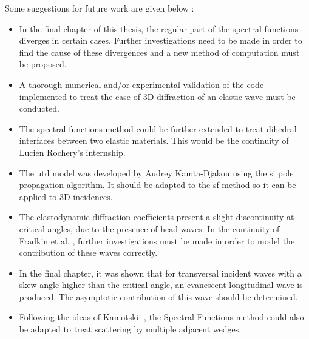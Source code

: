 Some suggestions for future work are given below :
\begin{itemize}
\item In the final chapter of this thesis, the regular part of the spectral functions diverges in certain cases. Further investigations need to be made in order to find the cause of these divergences and a new method of computation must be proposed.
\item A thorough numerical and/or experimental validation of the code implemented to treat the case of 3D diffraction of an elastic wave must be conducted.
\item The spectral functions method could be further extended to treat dihedral interfaces between two elastic materials. This would be the continuity of Lucien Rochery's internship.
\item The \acrshort{utd} model was developed by Audrey Kamta-Djakou \cite{AKDthese} using the \acrfull{si} pole propagation algorithm. It should be adapted to the \acrshort{sf} method so it can be applied to 3D incidences.
\item The elastodynamic diffraction coefficients present a slight discontinuity at critical angles, due to the presence of head waves. In the continuity of Fradkin et al. \cite{FradkinDarmon}, further investigations must be made in order to model the contribution of these waves correctly.
\item In the final chapter, it was shown that for transversal incident waves with a skew angle higher than the critical angle, an evanescent longitudinal wave is produced. The asymptotic contribution of this wave should be determined.
\item Following the ideas of Kamotskii \cite{Kamotski2}, the Spectral Functions method could also be adapted to treat scattering by multiple adjacent wedges.
\end{itemize}